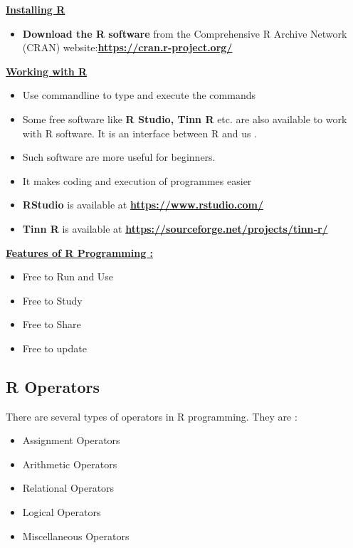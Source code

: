 \documentclass[
]{article}
\providecommand{\tightlist}{%
  \setlength{\itemsep}{0pt}\setlength{\parskip}{0pt}}
\begin{document}
\ul{\textbf{Installing R}}

\begin{itemize}
\tightlist
\item
  \textbf{Download the R software} from the Comprehensive R Archive
  Network (CRAN)
  website:\href{https://cran.r-project.org/}{\textbf{https://cran.r-project.org/}}
\end{itemize}

\ul{\textbf{Working with R}}

\begin{itemize}
\item
  Use commandline to type and execute the commands
\item
  Some free software like \textbf{R Studio, Tinn R} etc. are also
  available to work with R software. It is an interface between R and us
  .
\item
  Such software are more useful for beginners.
\item
  It makes coding and execution of programmes easier
\item
  \textbf{RStudio} is available at
  \href{https://www.rstudio.com/}{\textbf{https://www.rstudio.com/}}
\item
  \textbf{Tinn R} is available at
  \href{https://sourceforge.net/projects/tinn‐r/}{\textbf{https://sourceforge.net/projects/tinn‐r/}}
\end{itemize}

\ul{\textbf{Features of R Programming :}}

\begin{itemize}
\item
  Free to Run and Use
\item
  Free to Study
\item
  Free to Share
\item
  Free to update
\end{itemize}

\subsection{R Operators}\label{r-operators}

There are several types of operators in R programming. They are :

\begin{itemize}
\item
  Assignment Operators
\item
  Arithmetic Operators
\item
  Relational Operators
\item
  Logical Operators
\item
  Miscellaneous Operators
\end{itemize}
\end{document}
